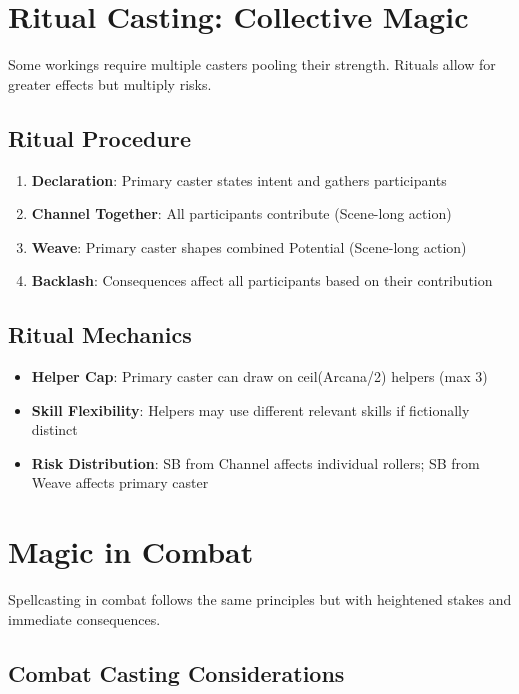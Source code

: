 \section*{Ritual Casting: Collective Magic}

Some workings require multiple casters pooling their strength. Rituals allow for greater effects but multiply risks.

\subsection*{Ritual Procedure}

\begin{enumerate}
    \item \textbf{Declaration}: Primary caster states intent and gathers participants
    \item \textbf{Channel Together}: All participants contribute (Scene-long action)
    \item \textbf{Weave}: Primary caster shapes combined Potential (Scene-long action)  
    \item \textbf{Backlash}: Consequences affect all participants based on their contribution
\end{enumerate}

\subsection*{Ritual Mechanics}

\begin{itemize}
    \item \textbf{Helper Cap}: Primary caster can draw on ceil(Arcana/2) helpers (max 3)
    \item \textbf{Skill Flexibility}: Helpers may use different relevant skills if fictionally distinct
    \item \textbf{Risk Distribution}: SB from Channel affects individual rollers; SB from Weave affects primary caster
\end{itemize}

\section*{Magic in Combat}

Spellcasting in combat follows the same principles but with heightened stakes and immediate consequences.

\subsection*{Combat Casting Considerations}

